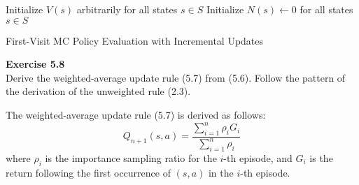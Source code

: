 \documentclass[addpoints]{exam}
\begin{document}
\begin{questions}
\begin{solution}
\begin{algorithm}[H]
    Initialize \( V(s) \) arbitrarily for all states \( s \in S \)\;
    Initialize \( N(s) \gets 0 \) for all states \( s \in S \)\;
    \caption{First-Visit MC Policy Evaluation with Incremental Updates}
\end{algorithm}
    \end{solution}

    \question
    \textbf{Exercise 5.8} \\ Derive the weighted-average update rule (5.7) from (5.6). Follow the pattern of the derivation of the unweighted rule (2.3).
    \begin{solution}
        The weighted-average update rule (5.7) is derived as follows:
        \[
        Q_{n+1}(s, a) = \frac{\sum_{i=1}^{n} \rho_i G_i}{\sum_{i=1}^{n} \rho_i}
        \]
        where \( \rho_i \) is the importance sampling ratio for the \( i \)-th episode, and \( G_i \) is the return following the first occurrence of \( (s, a) \) in the \( i \)-th episode.
    \end{solution}


\end{questions}
\end{document}
